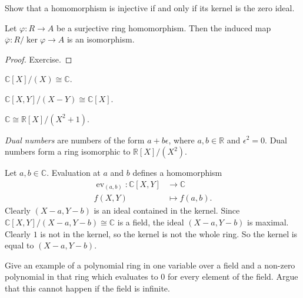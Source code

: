 \documentclass[a4paper,11pt]{article}
\begin{document}
    \begin{exercise}
      Show that a homomorphism is injective if and only if its kernel is the zero ideal.
    \end{exercise}

    \begin{theorem}
      Let \(\varphi: R \to A\) be a surjective ring homomorphism. Then the induced map \(\overline{\varphi}: R/\ker \varphi \to A\) is an isomorphism.
    \end{theorem}
    \begin{proof}
      Exercise.
    \end{proof}

    \begin{example}
      \(\mathbb{C}[X]/(X) \cong \mathbb{C}\).
    \end{example}

    \begin{example}
      \(\mathbb{C}[X,Y]/(X - Y) \cong \mathbb{C}[X]\).
    \end{example}

    \begin{example}
      \(\mathbb{C} \cong \mathbb{R}[X]/(X^2 + 1)\).
    \end{example}

    \begin{example}
      \emph{Dual numbers} are numbers of the form \(a + b\epsilon\), where \(a,b \in \mathbb{R}\) and \(\epsilon^2 = 0\). Dual numbers form a ring isomorphic to \(\mathbb{R}[X]/(X^2)\).
    \end{example}
    
    \begin{example}
      Let \(a,b \in \mathbb{C}\). Evaluation at \(a\) and \(b\) defines a homomorphism
      \begin{align*}
        \operatorname{ev}_{(a,b)}: \mathbb{C}[X,Y] &\to \mathbb{C} \\
        f(X, Y) &\mapsto f(a,b).
      \end{align*}
      Clearly \((X - a, Y - b)\) is an ideal contained in the kernel. Since \(\mathbb{C}[X,Y]/(X - a, Y - b) \cong \mathbb{C}\) is a field, the ideal \((X - a, Y - b)\) is maximal. Clearly \(1\) is not in the kernel, so the kernel is not the whole ring. So the kernel is equal to \((X - a, Y - b)\).
    \end{example}

    \begin{exercise}
      Give an example of a polynomial ring in one variable over a field and a non-zero polynomial in that ring which evaluates to \(0\) for every element of the field. Argue that this cannot happen if the field is infinite.
    \end{exercise}
\end{document}
